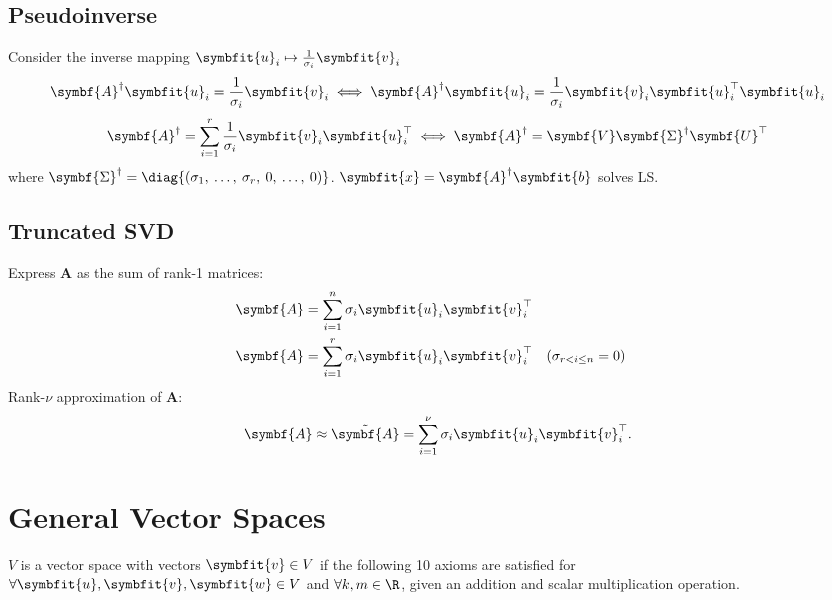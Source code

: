 \documentclass{article}
\begin{document}
\begin{multicols*}{3}
    \subsection{Pseudoinverse}
    Consider the inverse mapping \(\symbfit{u}_i \mapsto \frac{1}{\sigma_i} \symbfit{v}_i\)
    \begin{equation*}
        \symbf{A}^\dagger \symbfit{u}_i = \frac{1}{\sigma_i} \symbfit{v}_i
        \iff
        \symbf{A}^\dagger \symbfit{u}_i = \frac{1}{\sigma_i} \symbfit{v}_i \symbfit{u}^\top_i \symbfit{u}_i
    \end{equation*}
    \begin{equation*}
        \symbf{A}^\dagger = \sum_{i = 1}^r \frac{1}{\sigma_i} \symbfit{v}_i \symbfit{u}^\top_i
        \iff
        \symbf{A}^\dagger = \symbf{V} \symbf{\Sigma}^\dagger \symbf{U}^\top
    \end{equation*}
    where \(\symbf{\Sigma}^\dagger = \diag{\left( \sigma_1,\: \dots,\: \sigma_r,\: 0,\: \dots,\: 0 \right)}\).
    \(\symbfit{x} = \symbf{A}^\dagger \symbfit{b}\) solves LS\@.
    \subsection{Truncated SVD}
    Express \(\symbf{A}\) as the sum of rank-1 matrices:
    \begin{align*}
        \symbf{A} & = \sum_{i = 1}^n \sigma_i \symbfit{u}_i \symbfit{v}^\top_i                                  \\
        \symbf{A} & = \sum_{i = 1}^r \sigma_i \symbfit{u}_i \symbfit{v}^\top_i &  & (\sigma_{r < i \leq n} = 0)
    \end{align*}
    Rank-\(\nu\) approximation of \(\symbf{A}\):
    \begin{equation*}
        \symbf{A} \approx \tilde{\symbf{A}} = \sum_{i = 1}^\nu \sigma_i \symbfit{u}_i \symbfit{v}^\top_i.
    \end{equation*}
    \section{General Vector Spaces}
    \(V\) is a vector space with vectors \(\symbfit{v} \in V\) if the following 10 axioms are satisfied
    for \(\forall \symbfit{u}, \symbfit{v}, \symbfit{w} \in V\) and \(\forall k, m \in \R\),
    given an addition and scalar multiplication operation.


\end{multicols*}
\end{document}
